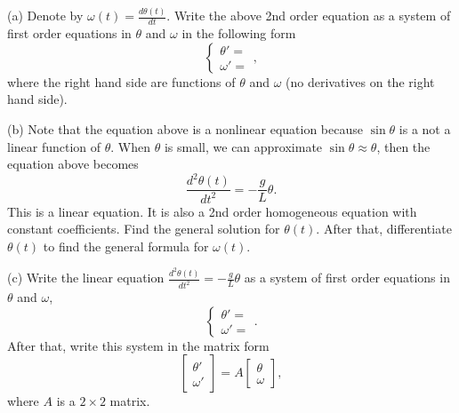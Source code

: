 \documentclass[11pt]{article}
\theoremstyle{definition}
\begin{document}
\begin{enumerate}[leftmargin=*]
(a) Denote by  $\omega(t)=\frac{d\theta(t)}{dt}$.  Write the above 2nd order equation as a system of first order equations  in $\theta$ and $\omega$ in the following form
\[
\begin{cases}
\theta'=\\
\omega'= 
\end{cases},
\]
where the right hand side are functions of $\theta$ and $\omega$ (no derivatives on the right hand side).  

(b) Note that the equation above is a nonlinear equation because $\sin\theta$ is a not a linear function of $\theta$.  When $\theta$ is small, we can approximate $\sin \theta\approx \theta$, then the equation above becomes 
\[
\frac{d^2\theta(t)}{dt^2}=-\frac{g}{L}\theta.
\]
This is a linear equation.  It is also a 2nd order homogeneous equation with constant coefficients.  Find the general solution for $\theta(t)$.  After that, differentiate $\theta(t)$ to find the general formula for $\omega(t)$.

(c) Write the linear equation $\frac{d^2\theta(t)}{dt^2}= -\frac{g}{L}\theta$ as a system of first order equations in $\theta$ and $\omega$,
\[
\begin{cases}
\theta'=\\
\omega'= 
\end{cases}.
\]
After that, write this system in the matrix form
\[
\left[\begin{array}{l} \theta'\\ \omega' \end{array}\right]=A  \left[\begin{array}{l} \theta \\ \omega \end{array}\right],
\]
where $A$ is a $2\times 2$ matrix.

 
 
 
\end{enumerate}
 
 
\end{document}
